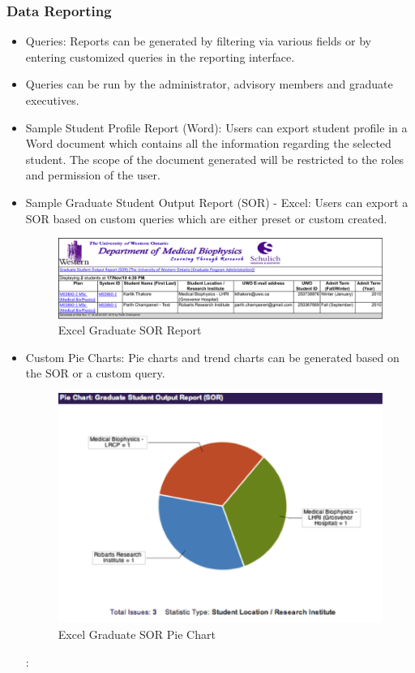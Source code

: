 \documentclass{journal}
\begin{document}
\subsubsection{Data Reporting}
\begin{itemize}
\item Queries: Reports can be generated by filtering via various fields or by entering customized queries in the reporting interface.
\item Queries can be run by the administrator, advisory members and graduate executives.
\item Sample Student Profile Report (Word): Users can export student profile in a Word document which contains all the information regarding the selected student. The scope of the document generated will be restricted to the roles and permission of the user.
\item Sample Graduate Student Output Report (SOR) - Excel: Users can export a SOR based on custom queries which are either preset or custom created.

\begin{figure}[htp]
\centering
\includegraphics[scale=1]{diagrams/HTMLTemplating/SOR_Excel.png}
\caption{Excel Graduate SOR Report}
\label{fig:ExcelSOR}
\end{figure}

\item Custom Pie Charts: Pie charts and trend charts can be generated based on the SOR or a custom query.

\begin{figure}[htp]
\centering
\includegraphics[scale=1]{diagrams/HTMLTemplating/PieChart.png}
\caption{Excel Graduate SOR Pie Chart}
\label{fig:PieSOR}
\end{figure}

:\end{itemize}
\end{document}

